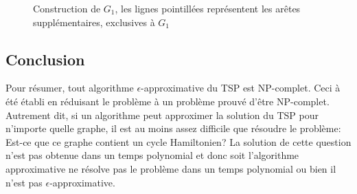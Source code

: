 \documentclass[../main.tex]{subfiles}
\begin{document}
\begin{figure}[ht]
    \centering
    \caption{Construction de $G_1$, les lignes pointillées représentent les arêtes supplémentaires, exclusives à $G_1$}
    \label{fig:epsi_approx}
\end{figure}

\subsection{Conclusion}
Pour résumer, tout algorithme $\epsilon$-approximative du TSP est NP-complet. Ceci à été établi en réduisant le problème à un problème prouvé d'être NP-complet. Autrement dit, si un algorithme peut approximer la solution du TSP pour n'importe quelle graphe, il est au moins assez difficile que résoudre le problème: Est-ce que ce graphe contient un cycle Hamiltonien? La solution de cette question n'est pas obtenue dans un temps polynomial et donc soit l'algorithme approximative ne résolve pas le problème dans un temps polynomial ou bien il n'est pas $\epsilon$-approximative.
\end{document}
